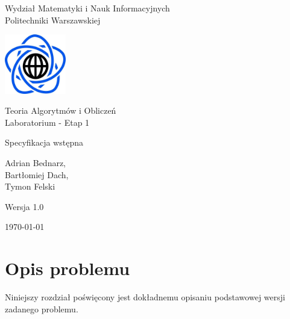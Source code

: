 \documentclass[12pt,a4paper]{article}
\theoremstyle{definition}
\begin{document}
\begin{titlepage}
	\centering
	{\Large Wydział Matematyki i Nauk Informacyjnych\\Politechniki Warszawskiej \par}
	\vspace{1cm}
	\includegraphics[width=0.2\textwidth]{res/img/logo.png} \par
	\vspace{4cm}
	{\LARGE Teoria Algorytmów i Obliczeń\\Laboratorium - Etap 1 \par}
	\vspace{0.5cm}
	{\LARGE Specyfikacja wstępna \par}
	\vspace{2cm}
	{\large Adrian Bednarz,\\Bartłomiej Dach,\\Tymon Felski \par}
	\vspace{2cm}
	{\large Wersja 1.0 \par}
	\vspace{0.5cm}
	{\large \today \par}
\end{titlepage}

\newpage
\tableofcontents
\newpage

\section{Opis problemu}
\label{sec:description}
Niniejszy rozdział poświęcony jest dokładnemu opisaniu podstawowej wersji zadanego problemu.\\
\end{document}
